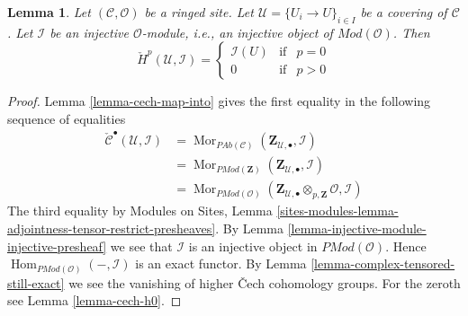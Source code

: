 \documentclass[10pt,a4paper]{amsart}
\theoremstyle{plain}
\newtheorem{lemma}[subsection]{Lemma}
\theoremstyle{definition}
\theoremstyle{remark}
\numberwithin{equation}{subsection}
\def\Hom{\mathop{\mathrm{Hom}}\nolimits}
\def\Mor{\mathop{\mathrm{Mor}}\nolimits}
\begin{document}
\begin{lemma}
\label{lemma-injective-module-trivial-cech}
Let $(\mathcal{C}, \mathcal{O})$ be a ringed site.
Let $\mathcal{U} = \{U_i \to U\}_{i \in I}$ be a covering of $\mathcal{C}$.
Let $\mathcal{I}$ be an injective $\mathcal{O}$-module, i.e., an injective
object of $\textit{Mod}(\mathcal{O})$. Then
$$
\check{H}^p(\mathcal{U}, \mathcal{I}) =
\left\{
\begin{matrix}
\mathcal{I}(U) & \text{if} & p = 0 \\
0 & \text{if} & p > 0
\end{matrix}
\right.
$$
\end{lemma}

\begin{proof}
Lemma \ref{lemma-cech-map-into} gives the first equality in the following
sequence of equalities
\begin{align*}
\check{\mathcal{C}}^\bullet(\mathcal{U}, \mathcal{I})
& =
\Mor_{\textit{PAb}(\mathcal{C})}(
\mathbf{Z}_{\mathcal{U}, \bullet}, \mathcal{I}) \\
& =
\Mor_{\textit{PMod}(\mathbf{Z})}(
\mathbf{Z}_{\mathcal{U}, \bullet}, \mathcal{I}) \\
& =
\Mor_{\textit{PMod}(\mathcal{O})}(
\mathbf{Z}_{\mathcal{U}, \bullet} \otimes_{p, \mathbf{Z}} \mathcal{O},
\mathcal{I})
\end{align*}
The third equality by
Modules on Sites,
Lemma \ref{sites-modules-lemma-adjointness-tensor-restrict-presheaves}.
By Lemma \ref{lemma-injective-module-injective-presheaf}
we see that $\mathcal{I}$ is an injective object in
$\textit{PMod}(\mathcal{O})$.
Hence $\Hom_{\textit{PMod}(\mathcal{O})}(-, \mathcal{I})$
is an exact functor. By
Lemma \ref{lemma-complex-tensored-still-exact} we see the vanishing of
higher {\v C}ech cohomology groups.
For the zeroth see Lemma \ref{lemma-cech-h0}.
\end{proof}
\end{document}
